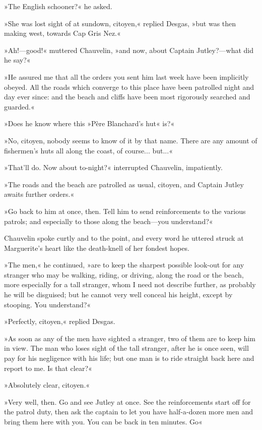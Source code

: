 »The English schooner?« he asked.

»She was lost sight of at sundown, citoyen,« replied Desgas, »but was then making west, towards Cap Gris Nez.«

»Ah!\allowbreak---\allowbreak good!\longdash« muttered Chauvelin, »and now, about Captain Jutley?\allowbreak---\allowbreak what did he say?«

»He assured me that all the orders you sent him last week have been implicitly obeyed. All the roads which converge to this place have been patrolled night and day ever since: and the beach and cliffs have been most rigorously searched and guarded.«

»Does he know where this »Père Blanchard's hut« is?«

»No, citoyen, nobody seems to know of it by that name. There are any amount of fishermen's huts all along the coast, of course... but...«

»That'll do. Now about to-night?« interrupted Chauvelin, impatiently.

»The roads and the beach are patrolled as usual, citoyen, and Captain Jutley awaits further orders.«

»Go back to him at once, then. Tell him to send reinforcements to the various patrols; and especially to those along the beach\allowbreak---\allowbreak you understand?«

Chauvelin spoke curtly and to the point, and every word he uttered struck at Marguerite's heart like the death-knell of her fondest hopes.

»The men,« he continued, »are to keep the sharpest possible look-out for any stranger who may be walking, riding, or driving, along the road or the beach, more especially for a tall stranger, whom I need not describe further, as probably he will be disguised; but he cannot very well conceal his height, except by stooping. You understand?«

»Perfectly, citoyen,« replied Desgas.

»As soon as any of the men have sighted a stranger, two of them are to keep him in view. The man who loses sight of the tall stranger, after he is once seen, will pay for his negligence with his life; but one man is to ride straight back here and report to me. Is that clear?«

»Absolutely clear, citoyen.«

»Very well, then. Go and see Jutley at once. See the reinforcements start off for the patrol duty, then ask the captain to let you have half-a-dozen more men and bring them here with you. You can be back in ten minutes. Go\longdash«

